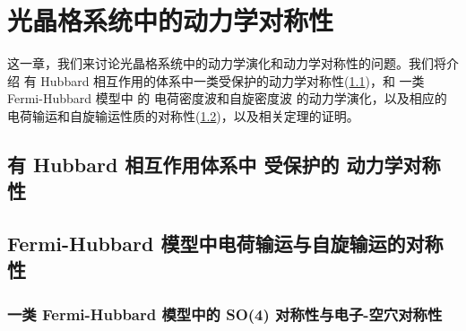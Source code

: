 \chapter{光晶格系统中的动力学对称性}

这一章，我们来讨论光晶格系统中的动力学演化和动力学对称性的问题。我们将介绍 有 Hubbard 相互作用的体系中一类受保护的动力学对称性(\ref{sec:dynsymm})，和 一类 Fermi-Hubbard 模型中 的 电荷密度波和自旋密度波 的动力学演化，以及相应的电荷输运和自旋输运性质的对称性(\ref{sec:diffusion})，以及相关定理的证明。



\section{有 Hubbard 相互作用体系中 受保护的 动力学对称性}\label{sec:dynsymm}





\section{Fermi-Hubbard 模型中电荷输运与自旋输运的对称性}\label{sec:diffusion}



\subsection{一类 Fermi-Hubbard 模型中的 SO(4) 对称性与电子-空穴对称性}\label{sec:so4}



